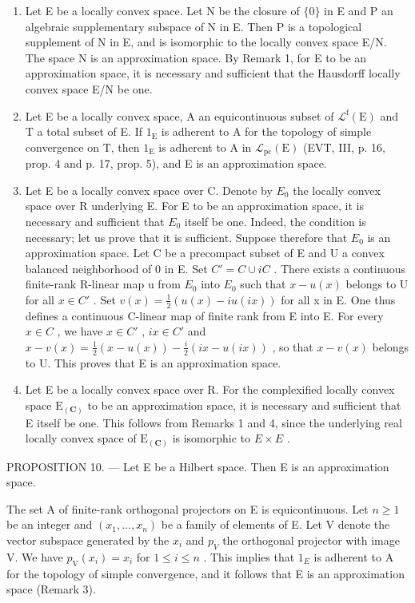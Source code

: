 \begin{enumerate}
\def\labelenumi{\arabic{enumi})}
\setcounter{enumi}{1}
\item
  Let E be a locally convex space. Let N be the closure of \(\{0\}\) in E and P an algebraic supplementary subspace of N in E. Then P is a topological supplement of N in E, and is isomorphic to the locally convex space E/N. The space N is an approximation space. By Remark 1, for E to be an approximation space, it is necessary and sufficient that the Hausdorff locally convex space E/N be one.
\item
  Let E be a locally convex space, A an equicontinuous subset of \(\mathcal{L}^{\mathrm{f}}(\mathrm{E})\) and T a total subset of E. If \(1_{\mathrm{E}}\) is adherent to A for the topology of simple convergence on T, then \(1_{\mathrm{E}}\) is adherent to A in \(\mathcal{L}_{\mathrm{pc}}(\mathrm{E})\) (EVT, III, p. 16, prop. 4 and p. 17, prop. 5), and E is an approximation space.
\item
  Let E be a locally convex space over C. Denote by \(E_{0}\) the locally convex space over R underlying E. For E to be an approximation space, it is necessary and sufficient that \(E_{0}\) itself be one. Indeed, the condition is necessary; let us prove that it is sufficient. Suppose therefore that \(E_{0}\) is an approximation space. Let C be a precompact subset of E and U a convex balanced neighborhood of 0 in E. Set \(C' = C \cup iC\) . There exists a continuous finite-rank R-linear map u from \(E_{0}\) into \(E_{0}\) such that \(x - u(x)\) belongs to U for all \(x \in C'\) . Set \(v(x) = \frac{1}{2}(u(x) - iu(ix))\) for all x in E. One thus defines a continuous C-linear map of finite rank from E into E. For every \(x \in C\) , we have \(x \in C'\) , \(ix \in C'\) and \(x - v(x) = \frac{1}{2}(x - u(x)) - \frac{i}{2}(ix - u(ix))\) , so that \(x - v(x)\) belongs to U. This proves that E is an approximation space.
\item
  Let E be a locally convex space over R. For the complexified locally convex space \(\mathrm{E}_{(\mathbf{C})}\) to be an approximation space, it is necessary and sufficient that E itself be one. This follows from Remarks 1 and 4, since the underlying real locally convex space of \(\mathrm{E}_{(\mathbf{C})}\) is isomorphic to \(E \times E\) .
\end{enumerate}

PROPOSITION 10. --- Let E be a Hilbert space. Then E is an approximation space.

The set A of finite-rank orthogonal projectors on E is equicontinuous. Let \(n \geqslant 1\) be an integer and \((x_{1}, \ldots, x_{n})\) be a family of elements of E. Let V denote the vector subspace generated by the \(x_{i}\) and \(p_{V}\) the orthogonal projector with image V. We have \(p_{\mathrm{V}}(x_{i}) = x_{i}\) for \(1 \leqslant i \leqslant n\) . This implies that \(1_{E}\) is adherent to A for the topology of simple convergence, and it follows that E is an approximation space (Remark 3).

